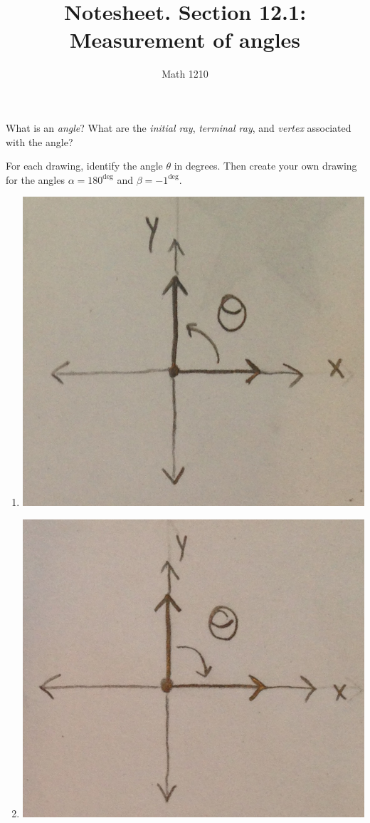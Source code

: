 \documentclass[12pt, a4paper]{article}
\author{Math 1210}
\title{Notesheet. Section 12.1: Measurement of angles}
\date{}
\begin{document}
\maketitle
\nameline
\begin{defi}
  What is an \emph{angle}?  What are the \emph{initial ray}, \emph{terminal ray}, and \emph{vertex} associated with the angle?
\end{defi}
\vs\vs
\begin{ex}
  For each drawing, identify the angle $\theta$ in degrees.  Then create your own drawing for the angles $\alpha = 180^\deg$ and $\beta = -1^\deg$.
  \begin{enumerate}
    \item \includegraphics[scale=0.10]{images/angle-1}
    \item \includegraphics[scale=0.10]{images/angle-2}

\end{enumerate}
\end{ex}
\end{document}
